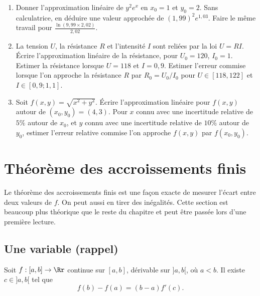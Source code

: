 \documentclass[12pt, class=report,crop=false]{standalone}
\begin{document}
\begin{miniexercices}
\sauteligne
\begin{enumerate}

  \item Donner l'approximation linéaire de $y^2e^x$ en $x_0=1$ et $y_0=2$. Sans calculatrice, en déduire une valeur approchée de $(1,99)^2 e^{1,03}$. Faire le même travail pour $\frac{\ln(9,99 \times 2,02)}{2,02}$.
  
  \item La tension $U$, la résistance $R$ et l'intensité $I$ sont reliées par la loi $U = RI$. \'Ecrire l'approximation linéaire de la résistance, pour $U_0 = 120$, $I_0 = 1$. Estimer la résistance lorsque $U = 118$ et $I = 0,9$.
  Estimer l'erreur commise lorsque l'on approche la résistance $R$ par $R_0 = U_0/I_0$ pour $U \in [118,122]$ et $I \in [0,9 ; 1,1]$.
  
  \item Soit $f(x,y) = \sqrt{x^2 + y^2}$. \'Ecrire l'approximation linéaire  pour $f(x,y)$ autour de $(x_0,y_0) = (4,3)$.
  Pour $x$ connu avec une incertitude relative de $5\%$ autour de $x_0$,
  et $y$ connu avec une incertitude relative de $10\%$ autour de $y_0$, estimer l'erreur relative commise l'on approche $f(x,y)$ par $f(x_0,y_0)$.
    
\end{enumerate}
\end{miniexercices}


\section{Théorème des accroissements finis}

Le théorème des accroissements finis est une façon exacte de mesurer l'écart entre deux valeurs de $f$. On peut aussi en tirer des inégalités. Cette section est beaucoup plus théorique que le reste du chapitre et peut être passée lors d'une première lecture.


\subsection{Une variable (rappel)}

\begin{theoreme}
Soit $f:[a,b] \rightarrow \Rr$ continue sur $[a,b]$, dérivable sur $]a,b[$,  o\`u $a<b$. Il existe $c \in ]a,b[$ tel que
$$f(b)-f(a)=(b-a)f'(c).$$
\end{theoreme}
 
\end{document}
